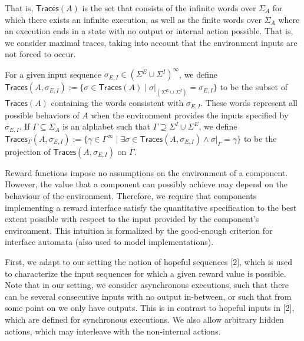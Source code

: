 \documentclass[10pt,a4paper]{article}
\begin{document}
That is, $\mathsf{Traces}(A)$ is the set that consists of the infinite words over $\Sigma_{A}$ for which there exists an infinite execution, as well as the finite words over $\Sigma_{A}$ where an execution ends in a state with no output or internal action possible. That is, we consider maximal traces, taking into account that the environment inputs are not forced to occur.\par
 
 
 
For a given input sequence $\sigma_{E,I}\in(\Sigma^{E}\cup\Sigma^{I})^{\infty}$, we define $\mathsf{Traces}(A,\sigma_{E,I}):=\{\sigma\in\mathsf{Traces}(A)\mid\sigma|_{(\Sigma^{E}\cup\Sigma^{I})}=\sigma_{E,I}\}$ to be the subset of $\mathsf{Traces}(A)$ containing the words consistent with $\sigma_{E,I}$. These words represent all possible behaviors of $A$ when the environment provides the inputs specified by $\sigma_{E,I}$. If $\Gamma\subseteq\Sigma_{A}$ is an alphabet such that $\Gamma\supseteq\Sigma^{I}\cup\Sigma^{E}$, we define $\mathsf{Traces}_{\Gamma}(A,\sigma_{E,I}):=\{\gamma\in\Gamma^{\infty}\mid\exists\sigma\in\mathsf{Traces}(A,\sigma_{E,I})\land\sigma|_{\Gamma}=\gamma\}$ to be the projection of $\mathsf{Traces}(A,\sigma_{E,I})$ on $\Gamma$.\par
 
 
 
Reward functions impose no assumptions on the environment of a component. However, the value that a component can possibly achieve may depend on the behaviour of the environment. Therefore, we require that components implementing a reward interface satisfy the quantitative specification to the best extent possible with respect to the input provided by the component’s environment. This intuition is formalized by the good-enough criterion for interface automata (also used to model implementations).\par
 
 
 
First, we adapt to our setting the notion of hopeful sequences [2], which is used to characterize the input sequences for which a given reward value is possible. Note that in our setting, we consider asynchronous executions, such that there can be several consecutive inputs with no output in-between, or such that from some point on we only have outputs. This is in contrast to hopeful inputs in [2], which are defined for synchronous executions. We also allow arbitrary hidden actions, which may interleave with the non-internal actions.\par
 
\end{document}
